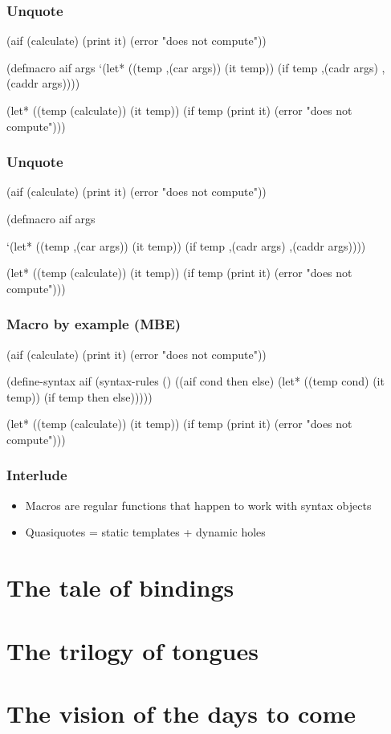 \documentclass[hyperref={bookmarks=false}]{beamer}
\begin{document}
\begin{frame}[fragile]
\frametitle{Unquote}
\begin{semiverbatim}
(aif (calculate)
  (print it)
  (error "does not compute"))

(defmacro aif args
  \alert{     `}(let*            ((temp \alert{,(car args)})
                          (it  temp))
          (if  temp
            \alert{,(cadr args)}
            \alert{,(caddr args)})))

(let* ((temp (calculate))
       (it temp))
  (if temp
    (print it)
    (error "does not compute")))
\end{semiverbatim}
\end{frame}

\begin{frame}[fragile]
\frametitle{Unquote}
\begin{semiverbatim}
(aif (calculate)
  (print it)
  (error "does not compute"))

(defmacro      aif args


    `(let* ((temp ,(car args))
            (it temp))
       (if temp
           ,(cadr args)
           ,(caddr args))))

(let* ((temp (calculate))
       (it temp))
  (if temp
    (print it)
    (error "does not compute")))
\end{semiverbatim}
\end{frame}

\begin{frame}[fragile]
\frametitle{Macro by example (MBE)}
\begin{semiverbatim}
(aif (calculate)
  (print it)
  (error "does not compute"))

(define-syntax aif
  (syntax-rules ()
    (\alert{(aif cond then else)}
     (let* ((temp \alert{cond})
            (it temp))
       (if temp
           \alert{then}
           \alert{else})))))

(let* ((temp (calculate))
       (it temp))
  (if temp
    (print it)
    (error "does not compute")))
\end{semiverbatim}
\end{frame}

\begin{frame}[fragile]
\frametitle{Interlude}
\begin{itemize}
\item Macros are regular functions that happen to work with syntax objects
\item Quasiquotes = static templates + dynamic holes
\end{itemize}
\end{frame}

\section{The tale of bindings}

\section{The trilogy of tongues}

\section{The vision of the days to come}
\end{document}
